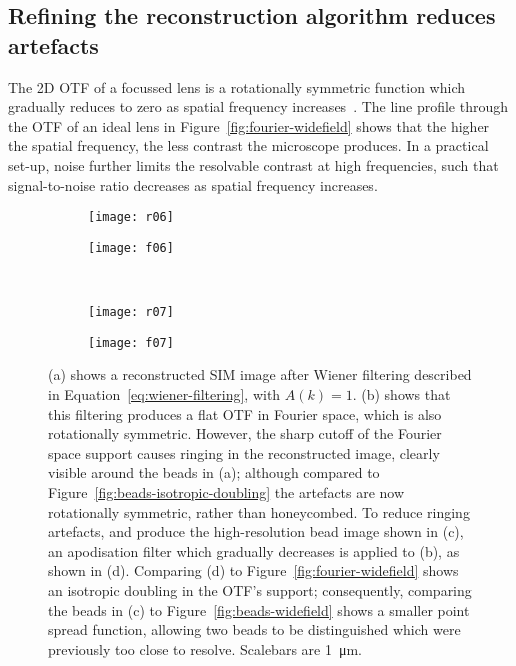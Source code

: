 \subsection{Refining the reconstruction algorithm reduces artefacts}
The 2D OTF of a focussed lens is a rotationally symmetric function which gradually reduces to zero as spatial frequency increases~\cite{williams2002introduction}.
The line profile through the OTF of an ideal lens in Figure~\ref{fig:fourier-widefield} shows that the higher the spatial frequency, the less contrast the microscope produces.
In a practical set-up, noise further limits the resolvable contrast at high frequencies, such that signal-to-noise ratio decreases as spatial frequency increases.

\begin{figure}[tbp]
\vspace{-6pt} \centering
\begin{subfigure}[b]{0.45\textwidth}
	\texttt{[image: r06]}
	\caption{}\label{fig:beads-wiener}
\end{subfigure}
\raisebox{9.3em}{\noindent\Huge$\Leftrightarrow$}
\begin{subfigure}[b]{0.45\textwidth}
	\texttt{[image: f06]}
	\caption{}\label{fig:fourier-wiener}
\end{subfigure}

~\newline
\begin{subfigure}[b]{0.45\textwidth}
	\texttt{[image: r07]}
	\caption{}\label{fig:beads-apodised}
\end{subfigure}
\raisebox{9.3em}{\noindent\Huge$\Leftrightarrow$}
\begin{subfigure}[b]{0.45\textwidth}
	\texttt{[image: f07]}
	\caption{}\label{fig:fourier-apodised}
\end{subfigure}
\caption[LAG SIM: Wiener filtering of the SIM OTF is required for artefact-free reconstruction]{(a) shows a reconstructed SIM image after Wiener filtering described in Equation~\ref{eq:wiener-filtering}, with $A\left(k\right) = 1$.
(b) shows that this filtering produces a flat OTF in Fourier space, which is also rotationally symmetric.
However, the sharp cutoff of the Fourier space support causes ringing in the reconstructed image, clearly visible around the beads in (a); although compared to Figure~\ref{fig:beads-isotropic-doubling} the artefacts are now rotationally symmetric, rather than honeycombed.
To reduce ringing artefacts, and produce the high-resolution bead image shown in (c), an apodisation filter which gradually decreases is applied to (b), as shown in (d).
Comparing (d) to Figure~\ref{fig:fourier-widefield} shows an isotropic doubling in the OTF's support; consequently, comparing the beads in (c) to Figure~\ref{fig:beads-widefield} shows a smaller point spread function, allowing two beads to be distinguished which were previously too close to resolve. Scalebars are \SI{1}{\micro\metre}.}
\label{fig:sim-OTFs}
\end{figure}


